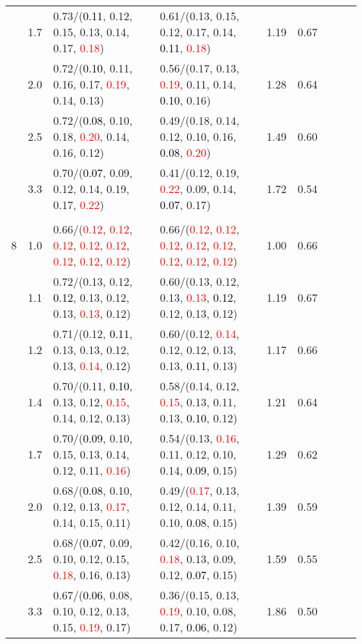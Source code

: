 \documentclass[10pt,a4paper]{report}
\begin{document}
\begin{table}[!htbp]
\begin{center}
{\begin{tabular}{ccllccccc}
			&1.7&0.73/(\textcolor{black}{0.11}, 0.12, 0.15, 0.13, 0.14, 0.17, \textcolor{red}{0.18})&0.61/(0.13, 0.15, 0.12, 0.17, 0.14, \textcolor{black}{0.11}, \textcolor{red}{0.18})&1.19&0.67\\
			&2.0&0.72/(\textcolor{black}{0.10}, 0.11, 0.16, 0.17, \textcolor{red}{0.19}, 0.14, 0.13)&0.56/(0.17, 0.13, \textcolor{red}{0.19}, 0.11, 0.14, \textcolor{black}{0.10}, 0.16)&1.28&0.64\\
			&2.5&0.72/(\textcolor{black}{0.08}, 0.10, 0.18, \textcolor{red}{0.20}, 0.14, 0.16, 0.12)&0.49/(0.18, 0.14, 0.12, 0.10, 0.16, \textcolor{black}{0.08}, \textcolor{red}{0.20})&1.49&0.60\\
			&3.3&0.70/(\textcolor{black}{0.07}, 0.09, 0.12, 0.14, 0.19, 0.17, \textcolor{red}{0.22})&0.41/(0.12, 0.19, \textcolor{red}{0.22}, 0.09, 0.14, \textcolor{black}{0.07}, 0.17)&1.72&0.54\\
			&&&&\\
			8			&1.0&0.66/(\textcolor{red}{0.12}, \textcolor{red}{0.12}, \textcolor{red}{0.12}, \textcolor{red}{0.12}, \textcolor{red}{0.12}, \textcolor{red}{0.12}, \textcolor{red}{0.12}, \textcolor{red}{0.12})&0.66/(\textcolor{red}{0.12}, \textcolor{red}{0.12}, \textcolor{red}{0.12}, \textcolor{red}{0.12}, \textcolor{red}{0.12}, \textcolor{red}{0.12}, \textcolor{red}{0.12}, \textcolor{red}{0.12})&1.00&0.66\\
			&1.1&0.72/(0.13, 0.12, \textcolor{black}{0.12}, 0.13, 0.12, 0.13, \textcolor{red}{0.13}, 0.12)&0.60/(0.13, 0.12, 0.13, \textcolor{red}{0.13}, \textcolor{black}{0.12}, 0.12, 0.13, 0.12)&1.19&0.67\\
			&1.2&0.71/(0.12, \textcolor{black}{0.11}, 0.13, 0.13, 0.12, 0.13, \textcolor{red}{0.14}, 0.12)&0.60/(0.12, \textcolor{red}{0.14}, 0.12, 0.12, 0.13, 0.13, \textcolor{black}{0.11}, 0.13)&1.17&0.66\\
			&1.4&0.70/(0.11, \textcolor{black}{0.10}, 0.13, 0.12, \textcolor{red}{0.15}, 0.14, 0.12, 0.13)&0.58/(0.14, 0.12, \textcolor{red}{0.15}, 0.13, 0.11, 0.13, \textcolor{black}{0.10}, 0.12)&1.21&0.64\\
			&1.7&0.70/(\textcolor{black}{0.09}, 0.10, 0.15, 0.13, 0.14, 0.12, 0.11, \textcolor{red}{0.16})&0.54/(0.13, \textcolor{red}{0.16}, 0.11, 0.12, 0.10, 0.14, \textcolor{black}{0.09}, 0.15)&1.29&0.62\\
			&2.0&0.68/(\textcolor{black}{0.08}, 0.10, 0.12, 0.13, \textcolor{red}{0.17}, 0.14, 0.15, 0.11)&0.49/(\textcolor{red}{0.17}, 0.13, 0.12, 0.14, 0.11, 0.10, \textcolor{black}{0.08}, 0.15)&1.39&0.59\\
			&2.5&0.68/(\textcolor{black}{0.07}, 0.09, 0.10, 0.12, 0.15, \textcolor{red}{0.18}, 0.16, 0.13)&0.42/(0.16, 0.10, \textcolor{red}{0.18}, 0.13, 0.09, 0.12, \textcolor{black}{0.07}, 0.15)&1.59&0.55\\
			&3.3&0.67/(\textcolor{black}{0.06}, 0.08, 0.10, 0.12, 0.13, 0.15, \textcolor{red}{0.19}, 0.17)&0.36/(0.15, 0.13, \textcolor{red}{0.19}, 0.10, 0.08, 0.17, \textcolor{black}{0.06}, 0.12)&1.86&0.50\\
			\bottomrule
		\end{tabular}}
	\end{center}
\end{table}
\end{document}
